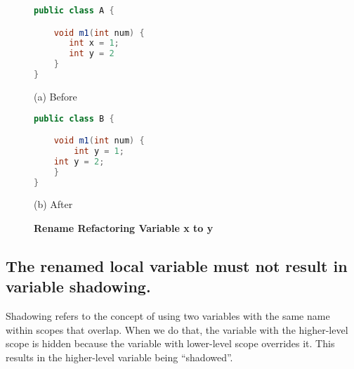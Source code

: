 \begin{figure}[th]
\centering
\begin{minipage}[t]{0.45\linewidth}
\begin{lstlisting}[language=java, basicstyle=\scriptsize\ttfamily,frame=single]
public class A {

    void m1(int num) {
       int x = 1; 
       int y = 2
    }
}
\end{lstlisting}
\centering(a) Before 
\end{minipage}
\hfill
\begin{minipage}[t]{0.45\linewidth}
\begin{lstlisting}[language=java, basicstyle=\scriptsize\ttfamily,frame=single]
public class B {

    void m1(int num) {
        int y = 1; 
	int y = 2;
    }
}
\end{lstlisting}
\centering(b) After 
\end{minipage}
\caption{\textbf{Rename Refactoring Variable x to y}}
\label{figure:precond5_2}
\end{figure}

\subsection{The renamed local variable must not result in variable shadowing.}
Shadowing refers to the concept of using two variables with the same name within scopes that overlap. When we do that, the variable with the higher-level scope is hidden because the variable with lower-level scope overrides it. This results in the higher-level variable being ``shadowed''. 

